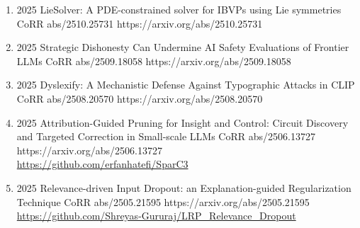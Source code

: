 {\begin{enumerate}
    
        \item {}
                        {2025}
                        {LieSolver: A PDE-constrained solver for IBVPs using Lie symmetries}
                        {CoRR abs/2510.25731}
                        {https://arxiv.org/abs/2510.25731}            
                        

        \item {}
                        {2025}
                        {Strategic Dishonesty Can Undermine AI Safety Evaluations of Frontier LLMs}
                        {CoRR abs/2509.18058}
                        {https://arxiv.org/abs/2509.18058}                       
                        
    
        \item {}
                        {2025}
                        {Dyslexify: A Mechanistic Defense Against Typographic Attacks in CLIP}
                        {CoRR abs/2508.20570}
                        {https://arxiv.org/abs/2508.20570}


        \item {}
                        {2025}
                        {Attribution-Guided Pruning for Insight and Control: Circuit Discovery and Targeted Correction in Small-scale LLMs}
                        {CoRR abs/2506.13727}
                        {https://arxiv.org/abs/2506.13727}
                        {
                            \\ \href{https://github.com/erfanhatefi/SparC3}{https://github.com/erfanhatefi/SparC3}
                        }
    
    
        \item {}
                        {2025}
                        {Relevance-driven Input Dropout: an Explanation-guided Regularization Technique}
                        {CoRR abs/2505.21595}
                        {https://arxiv.org/abs/2505.21595}
                        {
                            \\\href{https://github.com/Shreyas-Gururaj/LRP_Relevance_Dropout}{https://github.com/Shreyas-Gururaj/LRP\_Relevance\_Dropout}
                        }
    

\end{enumerate}}
